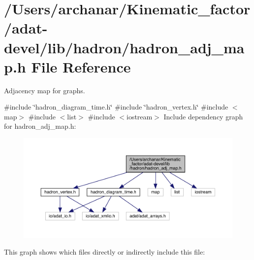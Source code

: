 \hypertarget{adat-devel_2lib_2hadron_2hadron__adj__map_8h}{}\section{/\+Users/archanar/\+Kinematic\+\_\+factor/adat-\/devel/lib/hadron/hadron\+\_\+adj\+\_\+map.h File Reference}
\label{adat-devel_2lib_2hadron_2hadron__adj__map_8h}


Adjacency map for graphs.  


{\ttfamily \#include \char`\"{}hadron\+\_\+diagram\+\_\+time.\+h\char`\"{}}\newline
{\ttfamily \#include \char`\"{}hadron\+\_\+vertex.\+h\char`\"{}}\newline
{\ttfamily \#include $<$map$>$}\newline
{\ttfamily \#include $<$list$>$}\newline
{\ttfamily \#include $<$iostream$>$}\newline
Include dependency graph for hadron\+\_\+adj\+\_\+map.\+h\+:
\nopagebreak
\begin{figure}[H]
\begin{center}
\leavevmode
\includegraphics[width=350pt]{d7/d5a/adat-devel_2lib_2hadron_2hadron__adj__map_8h__incl}
\end{center}
\end{figure}
This graph shows which files directly or indirectly include this file\+:
\nopagebreak
